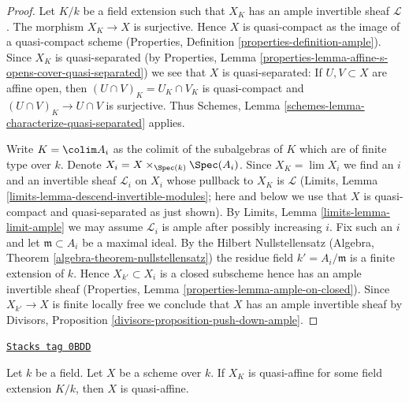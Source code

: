 \begin{proof}
Let $K/k$ be a field extension such that $X_K$ has
an ample invertible sheaf $\mathcal{L}$.
The morphism $X_K \to X$ is surjective. Hence $X$ is quasi-compact
as the image of a quasi-compact scheme (Properties, Definition
\ref{properties-definition-ample}). Since $X_K$ is quasi-separated
(by Properties, Lemma
\ref{properties-lemma-affine-s-opens-cover-quasi-separated})
we see that $X$ is quasi-separated: If $U, V \subset X$ are
affine open, then $(U \cap V)_K = U_K \cap V_K$ is quasi-compact
and $(U \cap V)_K \to U \cap V$ is surjective. Thus
Schemes, Lemma \ref{schemes-lemma-characterize-quasi-separated} applies.

\medskip\noindent
Write $K = \colim A_i$ as the colimit of the subalgebras of $K$
which are of finite type over $k$. Denote
$X_i = X \times_{\Spec(k)} \Spec(A_i)$.
Since $X_K = \lim X_i$ we find an $i$ and an invertible sheaf
$\mathcal{L}_i$ on $X_i$ whose pullback to $X_K$ is $\mathcal{L}$
(Limits, Lemma \ref{limits-lemma-descend-invertible-modules};
here and below we use that $X$ is quasi-compact and quasi-separated as
just shown). By Limits, Lemma \ref{limits-lemma-limit-ample}
we may assume $\mathcal{L}_i$ is ample after possibly increasing $i$.
Fix such an $i$ and let $\mathfrak m \subset A_i$ be a maximal
ideal. By the Hilbert Nullstellensatz
(Algebra, Theorem \ref{algebra-theorem-nullstellensatz})
the residue field $k' = A_i/\mathfrak m$ is a finite
extension of $k$. Hence $X_{k'} \subset X_i$ is a closed subscheme
hence has an ample invertible sheaf
(Properties, Lemma \ref{properties-lemma-ample-on-closed}).
Since $X_{k'} \to X$ is finite locally free we conclude
that $X$ has an ample invertible sheaf by
Divisors, Proposition \ref{divisors-proposition-push-down-ample}.
\end{proof}

\begin{lemma}
\label{varieties-lemma-quasi-affine-after-field-extension}
\href{https://stacks.math.columbia.edu/tag/0BDD}{\texttt{Stacks tag 0BDD}}

Let $k$ be a field. Let $X$ be a scheme over $k$. If $X_K$ is quasi-affine
for some field extension $K/k$, then $X$ is quasi-affine.
\end{lemma}

